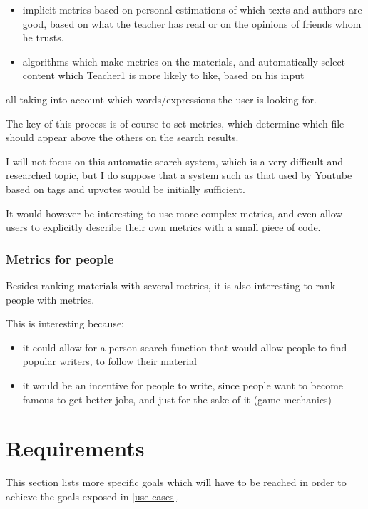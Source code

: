 \documentclass[12pt]{article}
\begin{document}
\begin{itemize}
  \item implicit metrics based on personal estimations of which texts and authors are good, based on what the teacher has read or on the opinions of friends whom he trusts.
  \item algorithms which make metrics on the materials, and automatically select content which Teacher1 is more likely to like, based on his input
\end{itemize}

all taking into account which words/expressions the user is looking for.

The key of this process is of course to set metrics, which determine which file should appear above the others on the search results.

I will not focus on this automatic search system, which is a very difficult and researched topic, but I do suppose that a system such as that used by Youtube based on tags and upvotes would be initially sufficient.

It would however be interesting to use more complex metrics, and even allow users to explicitly describe their own metrics with a small piece of code.

\subsubsection{Metrics for people} \label{metrics-for-people}

Besides ranking materials with several metrics, it is also interesting to rank people with metrics.

This is interesting because:

\begin{itemize}
  \item it could allow for a person search function that would allow people to find popular writers, to follow their material
  \item it would be an incentive for people to write, since people want to become famous to get better jobs, and just for the sake of it (game mechanics)
\end{itemize}

\section{Requirements} \label{requirements}

This section lists more specific goals which will have to be reached in order to achieve the goals exposed in \ref{use-cases}.
\end{document}
